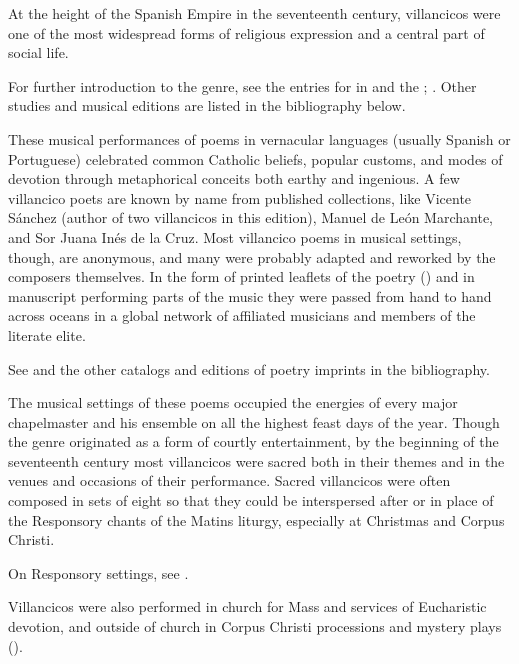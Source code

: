 At the height of the Spanish Empire in the seventeenth century,
villancicos were one of the most widespread forms of religious expression and a 
central part of social life.%
\begin{Footnote}
    For further introduction to the genre, see the entries for 
    in  and the ;
    \autocites
    {Laird:VC}
    [1--14]{Knighton-Torrente:VCs}
    [42--50, 55--56]{Laird:CatholicChurchMusic18C}.
    Other studies and musical editions are listed in the bibliography below.
\end{Footnote}
These musical performances of poems in vernacular languages (usually Spanish or
Portuguese) celebrated common Catholic beliefs, popular customs, and modes of
devotion through metaphorical conceits both earthy and ingenious.
A few villancico poets are known by name from published collections, like
Vicente Sánchez (author of two villancicos in this edition), Manuel de León
Marchante, and Sor Juana Inés de la Cruz. 
Most villancico poems in musical settings, though, are anonymous, and many were
probably adapted and reworked by the composers themselves.
In the form of printed leaflets of the poetry () and in 
manuscript performing parts of the music they were passed from hand to hand 
across oceans in a global network of affiliated musicians and members of the 
literate elite.%
\begin{Footnote}
    See \autocite{BNE:VCs17C} and the other catalogs and editions of poetry
    imprints in the bibliography.
\end{Footnote}

The musical settings of these poems occupied the energies of every major 
chapelmaster and his ensemble on all the highest feast days of the year.
Though the genre originated as a form of courtly entertainment, by the 
beginning of the seventeenth century most villancicos were sacred both in their 
themes and in the venues and occasions of their performance.
Sacred villancicos were often composed in sets of eight so that they could be 
interspersed after or in place of the Responsory chants of the Matins liturgy, 
especially at Christmas and Corpus Christi.%
\begin{Footnote}
    On Responsory settings, see \autocite{Goldman:Responsory}.
\end{Footnote}
Villancicos were also performed in church for Mass and services of Eucharistic
devotion, and outside of church in Corpus Christi processions and mystery plays
().

